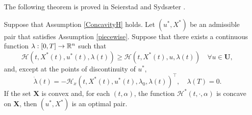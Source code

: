 The following theorem is proved in Seierstad and Syds\ae ter \cite[Theorem 3]{SeiSyd77}.  

\begin{theorem}\label{SufficientCond} Suppose that Assumption \ref{ConcavityH} holds. Let $(u^\ast,X^\ast)$ be an admissible pair that satisfies Assumption \ref{piecewise}. Suppose that there exists a continuous function $\lambda:[0,T]\to \mathbb{R}^n$ such that 
   \begin{equation}
       \mathcal{H}(t,X^\ast(t),u^\ast(t),\lambda(t)) \geq
       \mathcal{H}(t,X^\ast(t),u,\lambda(t)) \quad \forall u\in\mathbf{U},
   \end{equation}
and, except at the points of discontinuity of $u^\ast$,
    \begin{equation}
         \dot{\lambda}(t) = -\mathcal{H}_x(t,X^\ast(t),u^\ast(t),\lambda_0,\lambda(t))^\top, \quad \lambda(T)=0.
    \end{equation}
If the set $\mathbf{X}$ is convex and, for each $(t,\alpha)$, the function $\mathcal{H}^\ast(t,\cdot,\alpha)$ is concave on $\mathbf{X}$, then $(u^\ast,X^\ast)$ is an optimal pair.
\end{theorem}






